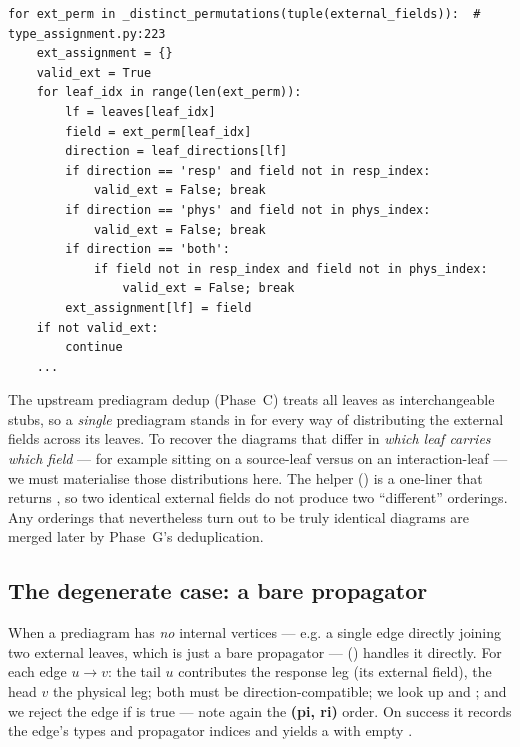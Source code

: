 \begin{lstlisting}
for ext_perm in _distinct_permutations(tuple(external_fields)):  # type_assignment.py:223
    ext_assignment = {}
    valid_ext = True
    for leaf_idx in range(len(ext_perm)):
        lf = leaves[leaf_idx]
        field = ext_perm[leaf_idx]
        direction = leaf_directions[lf]
        if direction == 'resp' and field not in resp_index:
            valid_ext = False; break
        if direction == 'phys' and field not in phys_index:
            valid_ext = False; break
        if direction == 'both':
            if field not in resp_index and field not in phys_index:
                valid_ext = False; break
        ext_assignment[lf] = field
    if not valid_ext:
        continue
    ...
\end{lstlisting}

The upstream prediagram dedup (Phase~C) treats all leaves as interchangeable
stubs, so a \emph{single} prediagram stands in for every way of distributing the
external fields across its leaves. To recover the diagrams that differ in
\emph{which leaf carries which field} --- for example  sitting on a
source-leaf versus on an interaction-leaf --- we must materialise those
distributions here. The helper 
() is a one-liner that returns
, so two identical external fields do not produce two
``different'' orderings. Any orderings that nevertheless turn out to be truly
identical diagrams are merged later by Phase~G's deduplication.

\subsection{The degenerate case: a bare propagator}

When a prediagram has \emph{no} internal vertices --- e.g. a single edge directly
joining two external leaves, which is just a bare propagator ---
 ()
handles it directly. For each edge $u\to v$: the tail $u$ contributes the
response leg (its external field), the head $v$ the physical leg; both must be
direction-compatible; we look up  and
; and we reject the edge if
 is true --- note again the \textbf{(pi, ri)} order.
On success it records the edge's types and propagator indices and yields a
 with empty .

